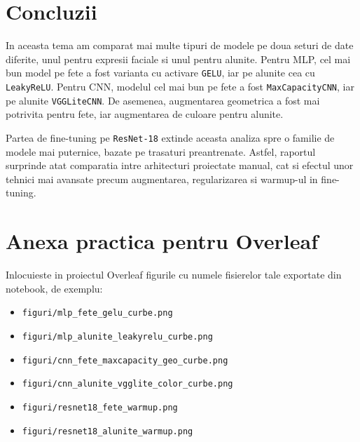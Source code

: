 \documentclass[12pt,a4paper]{article}
\begin{document}
\section{Concluzii}

In aceasta tema am comparat mai multe tipuri de modele pe doua seturi de date diferite, unul pentru expresii faciale si unul pentru alunite. Pentru MLP, cel mai bun model pe fete a fost varianta cu activare \texttt{GELU}, iar pe alunite cea cu \texttt{LeakyReLU}. Pentru CNN, modelul cel mai bun pe fete a fost \texttt{MaxCapacityCNN}, iar pe alunite \texttt{VGGLiteCNN}. De asemenea, augmentarea geometrica a fost mai potrivita pentru fete, iar augmentarea de culoare pentru alunite.

Partea de fine-tuning pe \texttt{ResNet-18} extinde aceasta analiza spre o familie de modele mai puternice, bazate pe trasaturi preantrenate. Astfel, raportul surprinde atat comparatia intre arhitecturi proiectate manual, cat si efectul unor tehnici mai avansate precum augmentarea, regularizarea si warmup-ul in fine-tuning.

\section*{Anexa practica pentru Overleaf}

Inlocuieste in proiectul Overleaf figurile cu numele fisierelor tale exportate din notebook, de exemplu:
\begin{itemize}
    \item \texttt{figuri/mlp\_fete\_gelu\_curbe.png}
    \item \texttt{figuri/mlp\_alunite\_leakyrelu\_curbe.png}
    \item \texttt{figuri/cnn\_fete\_maxcapacity\_geo\_curbe.png}
    \item \texttt{figuri/cnn\_alunite\_vgglite\_color\_curbe.png}
    \item \texttt{figuri/resnet18\_fete\_warmup.png}
    \item \texttt{figuri/resnet18\_alunite\_warmup.png}
\end{itemize}
\end{document}

